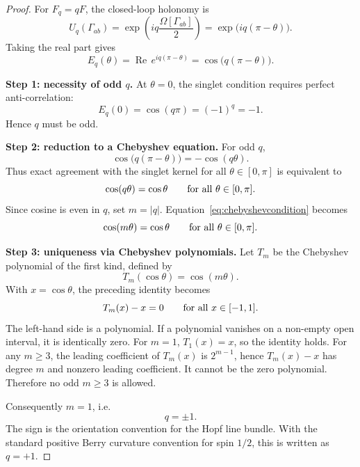 \documentclass[
  aps,
  pra,
  reprint,
  superscriptaddress,
  nofootinbib,
  longbibliography,
  floatfix,
  amsmath,
  amssymb
]{revtex4-2}
\theoremstyle{plain}
\theoremstyle{definition}
\theoremstyle{remark}
\begin{document}
\begin{proof}
For \(F_q=qF\), the closed-loop holonomy is
\begin{equation}
U_q(\Gamma_{ab})=
\exp\left(iq\frac{\Omega[\Gamma_{ab}]}{2}\right)
=\exp\bigl(iq(\pi-\theta)\bigr).
\end{equation}
Taking the real part gives
\begin{equation}
E_q(\theta)=\operatorname{Re}\,e^{iq(\pi-\theta)}
=\cos\bigl(q(\pi-\theta)\bigr).
\end{equation}

\textbf{Step 1: necessity of odd \(q\).}
At \(\theta=0\), the singlet condition requires perfect anti-correlation:
\begin{equation}
E_q(0)=\cos(q\pi)=(-1)^q=-1.
\end{equation}
Hence \(q\) must be odd.

\textbf{Step 2: reduction to a Chebyshev equation.}
For odd \(q\),
\begin{equation}
\cos\bigl(q(\pi-\theta)\bigr)=-\cos(q\theta).
\end{equation}
Thus exact agreement with the singlet kernel for all \(\theta\in[0,\pi]\) is equivalent to
\begin{equation}
\cos(q\theta)=\cos\theta
\qquad\hbox{for all }\theta\in[0,\pi].
\label{eq:chebyshevcondition}
\end{equation}
Since cosine is even in \(q\), set \(m=\lvert q\rvert\).  Equation~\eqref{eq:chebyshevcondition} becomes
\begin{equation}
\cos(m\theta)=\cos\theta
\qquad\hbox{for all }\theta\in[0,\pi].
\end{equation}

\textbf{Step 3: uniqueness via Chebyshev polynomials.}
Let \(T_m\) be the Chebyshev polynomial of the first kind, defined by
\begin{equation}
T_m(\cos\theta)=\cos(m\theta).
\end{equation}
With \(x=\cos\theta\), the preceding identity becomes
\begin{equation}
T_m(x)-x=0
\qquad\hbox{for all }x\in[-1,1].
\end{equation}
The left-hand side is a polynomial.  If a polynomial vanishes on a non-empty open interval, it is identically zero.  For \(m=1\), \(T_1(x)=x\), so the identity holds.  For any \(m\ge3\), the leading coefficient of \(T_m(x)\) is \(2^{m-1}\), hence \(T_m(x)-x\) has degree \(m\) and nonzero leading coefficient.  It cannot be the zero polynomial.  Therefore no odd \(m\ge3\) is allowed.

Consequently \(m=1\), i.e.
\begin{equation}
q=\pm1.
\end{equation}
The sign is the orientation convention for the Hopf line bundle.  With the standard positive Berry curvature convention for spin \(1/2\), this is written as \(q=+1\).
\end{proof}
\end{document}
